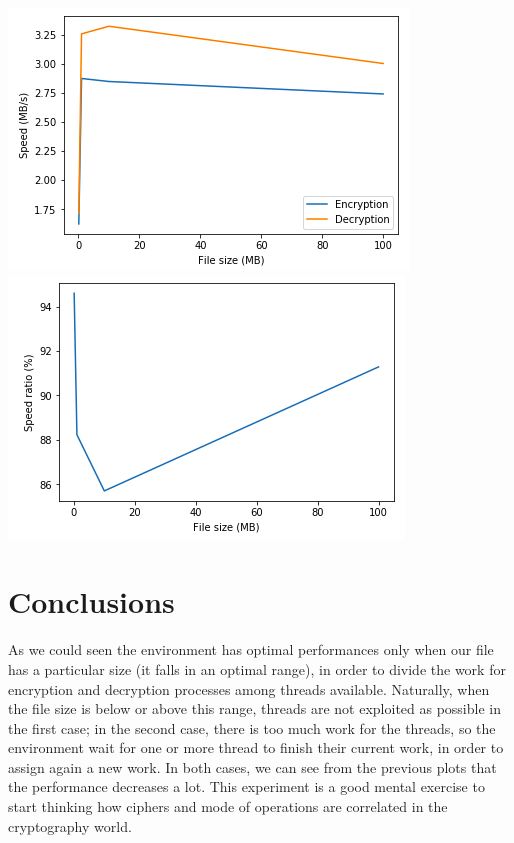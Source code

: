 \documentclass[11pt]{article}
\begin{document}
\begin{center}
\includegraphics[scale=0.4]{./enc_dec_speed_idea_cbc.png}
\includegraphics[scale=0.4]{./avg_speed_ratio_idea_cbc.png}
\end{center}
\section{Conclusions}
As we could seen the environment has optimal performances only when our file has a particular size (it falls in an optimal range), in order to divide the work for encryption and decryption processes among threads available. Naturally, when the file size is below or above this range, threads are not exploited as possible in the first case; in the second case, there is too much work for the threads, so the environment wait for one or more thread to finish their current work, in order to assign again a new work. In both cases, we can see from the previous plots that the performance decreases a lot. This experiment is a good mental exercise to start thinking how ciphers and mode of operations are correlated in the cryptography world.
\end{document}
